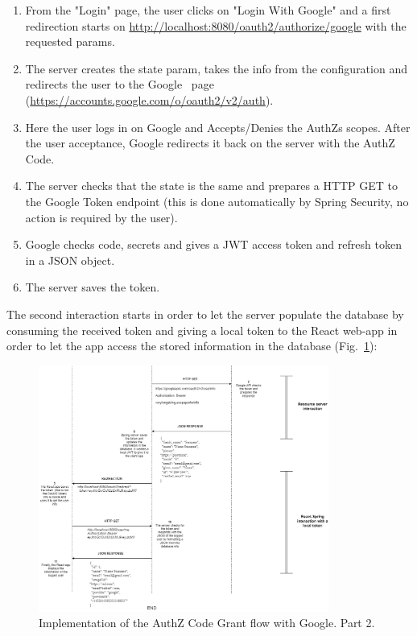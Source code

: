 \begin{enumerate}
    \item From the "Login" page, the user clicks on "Login With Google" and a first redirection starts on \url{http://localhost:8080/oauth2/authorize/google} with the requested params.
    \item The server creates the state param, takes the info from the configuration and redirects the user to the Google \oauth\ page (\url{https://accounts.google.com/o/oauth2/v2/auth}).
    \item Here the user logs in on Google and Accepts/Denies the AuthZs scopes. After the user acceptance, Google redirects it back on the server with the AuthZ Code.
    \item The server checks that the state is the same and prepares a HTTP GET to the Google Token endpoint (this is done automatically by Spring Security, no action is required by the user).
    \item Google checks code, secrets and gives a JWT access token and refresh token in a JSON object.
    \item The server saves the token.
\end{enumerate}

The second interaction starts in order to let the server populate the database by consuming the received token and giving a local token to the React web-app in order to let the app access the stored information in the database (Fig.~\ref{fig:google2}):

\begin{figure}[h]
    \centering
    \includegraphics[width=0.85\textwidth]{chapters/images/chp6/flow_google2.png}
    \caption{Implementation of the AuthZ Code Grant flow with Google. Part 2.}
    \label{fig:google2}
\end{figure}

